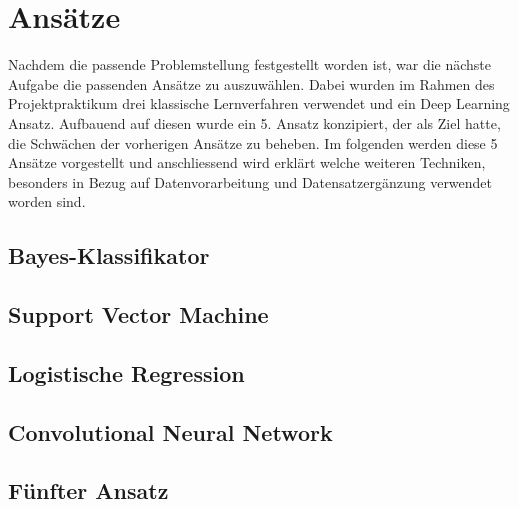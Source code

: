 \documentclass[researchlab,palatino]{AIGpaper}
\begin{document}
\section{Ansätze}

Nachdem die passende Problemstellung festgestellt worden ist, war die nächste Aufgabe die passenden Ansätze zu auszuwählen. Dabei wurden im Rahmen des Projektpraktikum drei klassische Lernverfahren verwendet und ein Deep Learning Ansatz. Aufbauend auf diesen wurde ein 5. Ansatz konzipiert, der als Ziel hatte, die Schwächen der vorherigen Ansätze zu beheben. Im folgenden werden diese 5 Ansätze vorgestellt und anschliessend wird erklärt welche weiteren Techniken, besonders in Bezug auf Datenvorarbeitung und Datensatzergänzung verwendet worden sind.

\subsection{Bayes-Klassifikator}


\subsection{Support Vector Machine}
 



\subsection{Logistische Regression}
 



\subsection{Convolutional Neural Network}
 

\subsection{Fünfter Ansatz}
 


 










\addreferences

\end{document}
